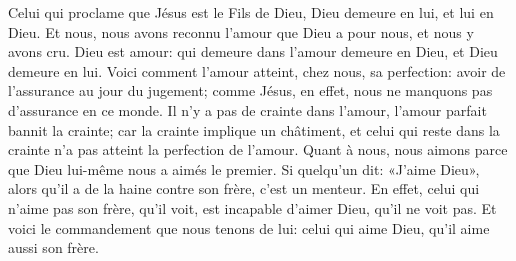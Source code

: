 Celui qui proclame que Jésus est le Fils de Dieu,
	Dieu demeure en lui, et lui en Dieu.
Et nous, nous avons reconnu l’amour que Dieu a pour nous,
	et nous y avons cru.
Dieu est amour:
	qui demeure dans l’amour demeure en Dieu, et Dieu demeure en lui.
Voici comment l’amour atteint, chez nous, sa perfection:
	avoir de l’assurance au jour du jugement;
	comme Jésus, en effet, nous ne manquons pas d’assurance en ce monde.
Il n’y a pas de crainte dans l’amour,
	l’amour parfait bannit la crainte;
	car la crainte implique un châtiment,
	et celui qui reste dans la crainte n’a pas atteint la perfection de l’amour.
Quant à nous, nous aimons parce que Dieu lui-même nous a aimés le premier.
Si quelqu’un dit: «J’aime Dieu», alors qu’il a de la haine contre son frère,
	c’est un menteur.
En effet, celui qui n’aime pas son frère, qu’il voit,
	est incapable d’aimer Dieu, qu’il ne voit pas.
Et voici le commandement que nous tenons de lui:
	celui qui aime Dieu, qu’il aime aussi son frère.
